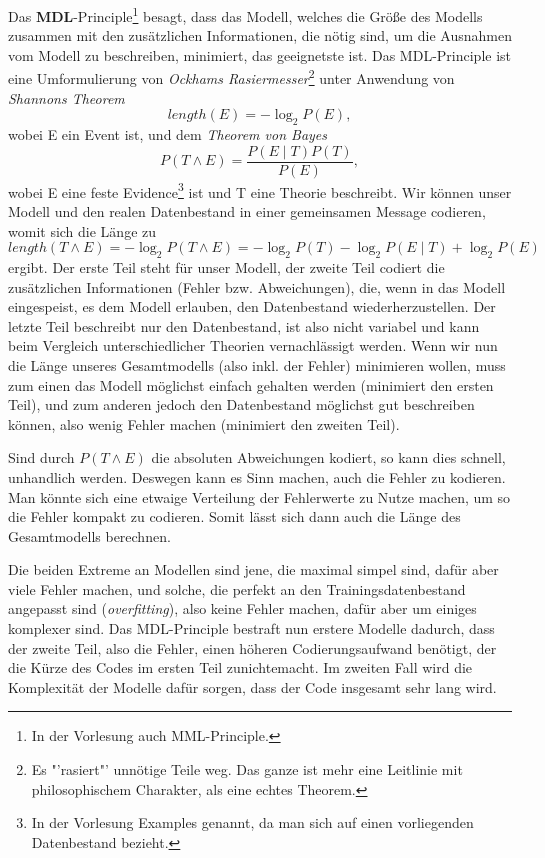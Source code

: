 Das \textbf{MDL}-Principle\footnote{In der Vorlesung auch MML-Principle.}
besagt, dass das Modell, welches die Größe des Modells zusammen mit den
zusätzlichen Informationen, die nötig sind, um die Ausnahmen vom Modell
zu beschreiben, minimiert, das geeignetste ist.
Das MDL-Principle ist eine 
Umformulierung von \textit{Ockhams Rasiermesser}\footnote{Es "'rasiert"'
unnötige Teile weg. Das ganze ist mehr eine Leitlinie mit philosophischem
Charakter, als eine echtes Theorem.}
unter Anwendung von \textit{Shannons Theorem}
\[
	length(E) = -\log_2 P(E),
\]
wobei E ein Event ist, und dem \textit{Theorem von Bayes} 
\[
	P(T\wedge E) = \frac{P(E \mid T)P(T)}{P(E)},
\]
wobei E eine feste Evidence\footnote{In der Vorlesung Examples genannt,
da man sich auf einen vorliegenden Datenbestand bezieht.}
ist und T eine Theorie beschreibt.
Wir können unser Modell und den realen Datenbestand in einer gemeinsamen
Message codieren, womit sich die Länge zu
\[
	length(T\wedge E) = -\log_2 P(T\wedge E) = -\log_2P(T) -\log_2 P(E \mid T) + \log_2P(E)
\]
ergibt. Der erste Teil steht für unser Modell, der zweite Teil codiert die 
zusätzlichen Informationen (Fehler bzw. Abweichungen),
die, wenn in das Modell eingespeist, es dem Modell
erlauben, den Datenbestand wiederherzustellen. Der letzte Teil beschreibt 
nur den Datenbestand, ist also nicht variabel und kann beim Vergleich unterschiedlicher
Theorien vernachlässigt werden. Wenn wir nun die Länge unseres Gesamtmodells (also
inkl. der Fehler) minimieren wollen, muss zum einen das Modell möglichst einfach
gehalten werden (minimiert den ersten Teil), und zum anderen jedoch den Datenbestand 
möglichst gut beschreiben können, also wenig Fehler machen (minimiert den zweiten Teil).

Sind durch \(P(T\wedge E)\) die absoluten Abweichungen kodiert, so kann dies schnell,
unhandlich werden. Deswegen kann es Sinn machen, auch die Fehler zu kodieren.
Man könnte sich eine etwaige Verteilung der Fehlerwerte zu Nutze machen, um so
die Fehler kompakt zu codieren. Somit lässt sich dann auch die Länge des Gesamtmodells
berechnen.

Die beiden Extreme an Modellen sind jene, die maximal simpel sind, dafür aber viele
Fehler machen, und solche, die perfekt an den Trainingsdatenbestand angepasst sind
(\textit{overfitting}), also keine Fehler machen, dafür aber um einiges komplexer sind.
Das MDL-Principle bestraft nun erstere Modelle dadurch, dass der zweite Teil, also
die Fehler, einen höheren Codierungsaufwand benötigt, der die Kürze des Codes im
ersten Teil zunichtemacht. Im zweiten Fall wird die Komplexität der Modelle dafür
sorgen, dass der Code insgesamt sehr lang wird.

